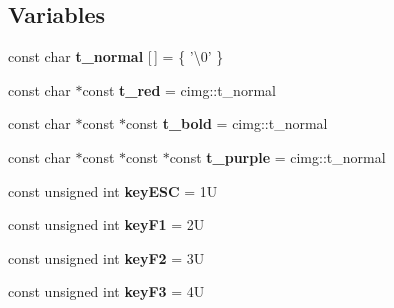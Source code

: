 \subsection*{Variables}
\begin{DoxyCompactItemize}
\item 
\hypertarget{namespacecimg__library_1_1cimg_a1a793062fba9fd7b63650a8a5ae7cf0c}{const char {\bfseries t\-\_\-normal} \mbox{[}$\,$\mbox{]} = \{ '\textbackslash{}0' \}}\label{namespacecimg__library_1_1cimg_a1a793062fba9fd7b63650a8a5ae7cf0c}

\item 
\hypertarget{namespacecimg__library_1_1cimg_a6ecafe64a12753c164fc400a891702fc}{const char $\ast$const {\bfseries t\-\_\-red} = cimg\-::t\-\_\-normal}\label{namespacecimg__library_1_1cimg_a6ecafe64a12753c164fc400a891702fc}

\item 
\hypertarget{namespacecimg__library_1_1cimg_adf940f5d27878472849db5021c8d6570}{const char $\ast$const $\ast$const {\bfseries t\-\_\-bold} = cimg\-::t\-\_\-normal}\label{namespacecimg__library_1_1cimg_adf940f5d27878472849db5021c8d6570}

\item 
\hypertarget{namespacecimg__library_1_1cimg_a56bfd6a63beb2cf797e8d97724e9390a}{const char $\ast$const $\ast$const $\ast$const {\bfseries t\-\_\-purple} = cimg\-::t\-\_\-normal}\label{namespacecimg__library_1_1cimg_a56bfd6a63beb2cf797e8d97724e9390a}

\item 
\hypertarget{namespacecimg__library_1_1cimg_adfae078959b4ad6d1695828a533088b0}{const unsigned int {\bfseries key\-E\-S\-C} = 1\-U}\label{namespacecimg__library_1_1cimg_adfae078959b4ad6d1695828a533088b0}

\item 
\hypertarget{namespacecimg__library_1_1cimg_a77b15159148b47f4b1088e5d76305439}{const unsigned int {\bfseries key\-F1} = 2\-U}\label{namespacecimg__library_1_1cimg_a77b15159148b47f4b1088e5d76305439}

\item 
\hypertarget{namespacecimg__library_1_1cimg_a0d23f41f3a6ffef9c9bec1dd8e705d30}{const unsigned int {\bfseries key\-F2} = 3\-U}\label{namespacecimg__library_1_1cimg_a0d23f41f3a6ffef9c9bec1dd8e705d30}

\item 
\hypertarget{namespacecimg__library_1_1cimg_a7221779329bd86e1e90110db72b58453}{const unsigned int {\bfseries key\-F3} = 4\-U}\label{namespacecimg__library_1_1cimg_a7221779329bd86e1e90110db72b58453}


\end{DoxyCompactItemize}
